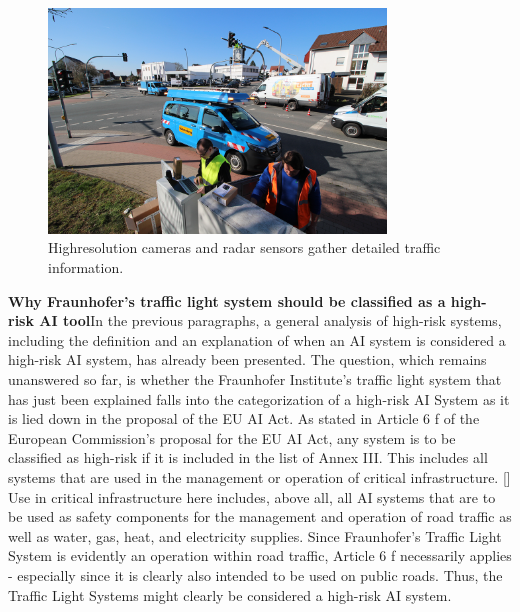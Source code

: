  \begin{figure}[h]
        \centering
        \includegraphics[width=0.8\textwidth]{paper-template/figs/traffic_light2.jpg}
        \caption{Highresolution cameras and radar sensors gather detailed traffic information.}
        \label{fig:my_label}
    \end{figure}
 \textbf{Why Fraunhofer's traffic light system should be classified as a high-risk AI tool}\newline In the previous paragraphs, a general analysis of high-risk systems, including the definition and an explanation of when an AI system is considered a high-risk AI system, has already been presented. The question, which remains unanswered so far, is whether the Fraunhofer Institute's traffic light system that has just been explained falls into the categorization of a high-risk AI System as it is lied down in the proposal of the EU AI Act.\newline
As stated in Article 6 f of the European Commission's proposal for the EU AI Act, any system is to be classified as high-risk if it is included in the list of Annex III. This includes all systems that are used in the management or operation of critical infrastructure. [\citet{madiega2021artificial}]  Use in critical infrastructure here includes, above all, all AI systems that are to be used as safety components for the management and operation of road traffic as well as water, gas, heat, and electricity supplies. \newline
Since Fraunhofer's Traffic Light System is evidently an operation within road traffic, Article 6 f necessarily applies - especially since it is clearly also intended to be used on public roads. Thus, the Traffic Light Systems might clearly be considered a high-risk AI system. 
